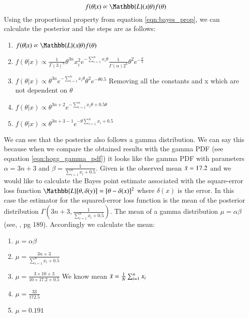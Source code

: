 \begin{equation} \label{eqn:bayes_prop}
    f(\theta|x) \propto \Mathbb{L}(x|\theta) f(\theta)
\end{equation}
Using the proportional property from equation \ref{eqn:bayes_prop}, we can calculate the posterior and the steps are as follows:
\begin{enumerate}
    \item $f(\theta|x) \propto \Mathbb{L}(x|\theta)f(\theta)$
    \item $f(\theta|x) \propto \frac{1}{\Gamma(3)^n} \theta^{3n} x_i^{2} e^{-\sum_{i=1}^{n}x_i\theta} \frac{1}{\Gamma(\alpha)2^3}\theta^2 e^{-\frac{\theta}{2}}$
    \item $f(\theta|x) \propto  \theta^{3n} e^{-\sum_{i=1}^{n}x_i\theta} \theta^2 e^{-\theta0.5}$ Removing all the constants and x which are not dependent on $\theta$
     \item $f(\theta|x) \propto  \theta^{3n+2} e^{-\sum_{i=1}^{n}x_i\theta +0.5\theta}$ 
    \item $f(\theta|x) \propto  \theta^{3n+3-1} e^{-\theta \sum_{i=1}^{n}x_i +0.5}$  
\end{enumerate}
We can see that the posterior also follows a gamma distribution. We can say this because when we compare the obtained results with the gamma PDF (see equation \ref{eqn:hogg_gamma_pdf}) it looks like the gamma PDF with parameters $\alpha=3n+3$ and $\beta=\frac{1}{\sum_{i=1}^{n}x_i +0.5}$. \newline \newline
Given is the observed mean $\Bar{x} = 17.2$ and we would like to calculate the Bayes point estimate associated with the square-error loss function $\Mathbb{L}[\theta, \delta(y)] = [\theta - \delta(x)]^2$ where $\delta(x)$ is the error. In this case the estimator for the squared-error loss function is the mean of the posterior distribution $\Gamma(3n+3, \frac{1}{\sum_{i=1}^{n}x_i +0.5})$. The mean of a gamma distribution $\mu = \alpha\beta$ (see, \cite{hogg:2005}, pg 189). Accordingly we calculate the mean:
\begin{enumerate}
    \item $\mu = \alpha\beta$
    \item $\mu = \frac{3n+3}{\sum_{i=1}^{n}x_i +0.5}$
    \item $ \mu = \frac{3\times10 + 3}{10\times 17.2 +0.5}$ We know mean $\Bar{x} = \frac{1}{N}\sum_{i=1}^{n}x_i$
    \item $ \mu = \frac{33}{172.5}$
    \item $ \mu = 0.191$
\end{enumerate}
